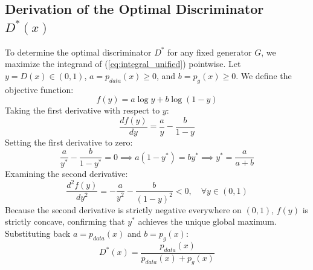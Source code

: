 \documentclass[conference]{IEEEtran}
\begin{document}
\subsection{Derivation of the Optimal Discriminator $D^*(x)$}
To determine the optimal discriminator $D^*$ for any fixed generator $G$, we maximize the integrand of (\ref{eq:integral_unified}) pointwise. Let $y = D(x) \in (0, 1)$, $a = p_{data}(x) \ge 0$, and $b = p_g(x) \ge 0$. We define the objective function:
\begin{equation}
f(y) = a \log y + b \log(1 - y)
\end{equation}
Taking the first derivative with respect to $y$:
\begin{equation}
\frac{df(y)}{dy} = \frac{a}{y} - \frac{b}{1 - y}
\end{equation}
Setting the first derivative to zero:
\begin{equation}
\frac{a}{y^*} - \frac{b}{1 - y^*} = 0 \implies a(1 - y^*) = b y^* \implies y^* = \frac{a}{a + b}
\end{equation}
Examining the second derivative:
\begin{equation}
\frac{d^2 f(y)}{dy^2} = -\frac{a}{y^2} - \frac{b}{(1 - y)^2} < 0, \quad \forall y \in (0, 1)
\end{equation}
Because the second derivative is strictly negative everywhere on $(0, 1)$, $f(y)$ is strictly concave, confirming that $y^*$ achieves the unique global maximum. Substituting back $a = p_{data}(x)$ and $b = p_g(x)$:
\begin{equation}
\boxed{D^*(x) = \frac{p_{data}(x)}{p_{data}(x) + p_g(x)}}
\label{eq:optimal_d}
\end{equation}
\end{document}
